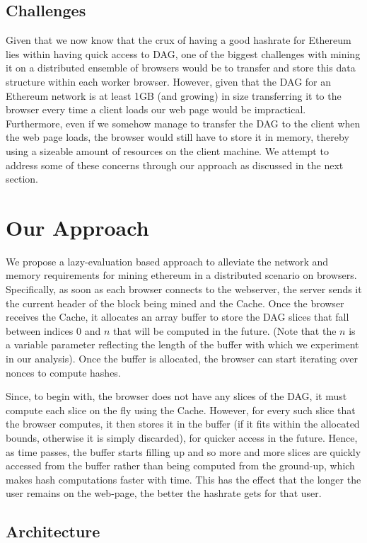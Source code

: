\documentclass[runningheads]{llncs}
\begin{document}
\subsection{Challenges}
Given that we now know that the crux of having a good hashrate for Ethereum lies within having quick access to DAG, one of the biggest challenges with mining it on a distributed ensemble of browsers would be to transfer and store this data structure within each worker browser. However, given that the DAG for an Ethereum network is at least 1GB (and growing) in size transferring it to the browser every time a client loads our web page would be impractical. Furthermore, even if we somehow manage to transfer the DAG to the client when the web page loads, the browser would still have to store it in memory, thereby using a sizeable amount of resources on the client machine. We attempt to address some of these concerns through our approach as discussed in the next section. 

\section{Our Approach}
We propose a lazy-evaluation based approach to alleviate the network and memory requirements for mining ethereum in a distributed scenario on browsers. Specifically, as soon as each browser connects to the webserver, the server sends it the current header of the block being mined and the Cache. Once the browser receives the Cache, it allocates an array buffer to store the DAG slices that fall between indices 0 and $n$ that will be computed in the future. (Note that the $n$ is a variable parameter reflecting the length of the buffer with which we experiment in our analysis). Once the buffer is allocated, the browser can start iterating over nonces to compute hashes.  

Since, to begin with, the browser does not have any slices of the DAG, it must compute each slice on the fly using the Cache. However, for every such slice that the browser computes, it then stores it in the buffer (if it fits within the allocated bounds, otherwise it is simply discarded), for quicker access in the future. Hence, as time passes, the buffer starts filling up and so more and more slices are quickly accessed from the buffer rather than being computed from the ground-up, which makes hash computations faster with time. This has the effect that the longer the user remains on the web-page, the better the hashrate gets for that user. 

\subsection{Architecture}
\end{document}
